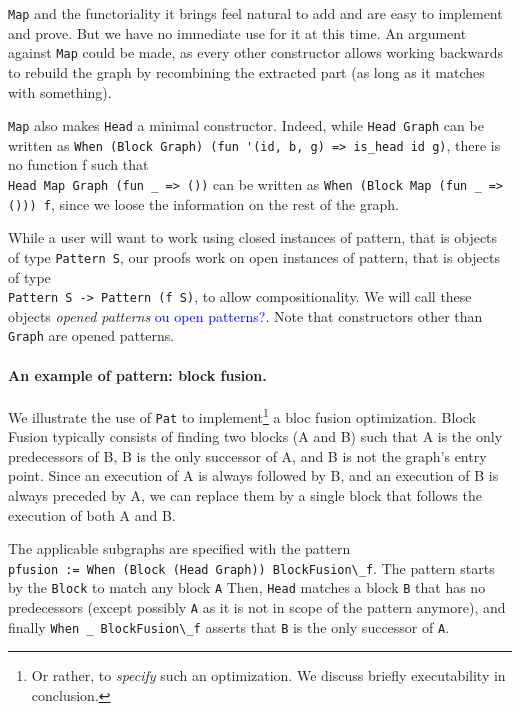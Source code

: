 \documentclass[11pt]{article}
\newcommand{\inlinecoq}[1]{\mbox{\lstinline[style=customcoq,columns=fixed,basewidth=.48em]{#1}}}
\newcommand{\ilc}[1]{\inlinecoq{#1}}
\newcommand{\leon}[1]{\textcolor{blue}{#1}}
\newcommand{\pat}{\texttt{Pat}\xspace}
\begin{document}
\ilc{Map} and the functoriality it brings feel natural to add and are easy to implement and prove. But we have no immediate use for it at this time. An argument against \ilc{Map} could be made, as every other constructor allows working backwards to rebuild the graph by recombining the extracted part (as long as it matches with something).

\ilc{Map} also makes \ilc{Head} a minimal constructor. Indeed, while \ilc{Head Graph} can be written as \ilc{When (Block Graph) (fun '(id, b, g) => is_head id g)}, there is no function f such that\\\ilc{Head Map Graph (fun _ => ())} can be written as \ilc{When (Block Map (fun _ => ())) f}, since we loose the information on the rest of the graph.

While a user will want to work using closed instances of pattern, that is objects of type \ilc{Pattern S}, our proofs work on open instances of pattern, that is objects of type\\\ilc{Pattern S -> Pattern (f S)}, to allow compositionality. We will call these objects \emph{opened patterns} \leon{ou open patterns?}. Note that constructors other than \ilc{Graph} are opened patterns.

\paragraph*{An example of pattern: block fusion.}
We illustrate the use of \pat{} to implement\footnote{Or rather, to \emph{specify} such an optimization. We discuss briefly executability in conclusion.} a bloc fusion optimization.
Block Fusion typically consists of finding two blocks (A and B) such that A is the only predecessors of B, B is the only successor of A, and B is not the graph's entry point. Since an execution of A is always followed by B, and an execution of B is always preceded by A, we can replace them by a single block that follows the execution of both A and B.

The applicable subgraphs are specified with the pattern\\\ilc{pfusion := When (Block (Head Graph)) BlockFusion\_f}.
The pattern starts by the \ilc{Block} to match any block \ilc{A} Then, \ilc{Head} matches a block \ilc{B} that has no predecessors (except possibly \ilc{A} as it is not in scope of the pattern anymore), and finally \ilc{When _ BlockFusion\_f} asserts that \ilc{B} is the only successor of \ilc{A}.
\end{document}
